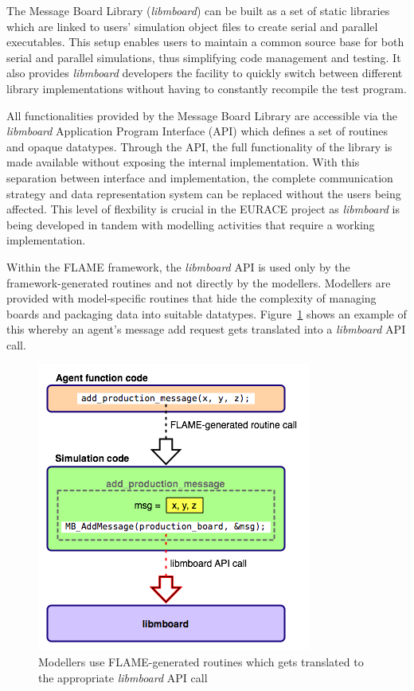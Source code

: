 The Message Board Library (\textit{libmboard}) can be built as a set of static libraries which are linked to users' simulation object files to create serial and parallel executables. This setup enables users to maintain a common source base for both serial and parallel simulations, thus simplifying code management and testing. It also provides \textit{libmboard} developers the facility to quickly switch between different library implementations without having to constantly recompile the test program.

All functionalities provided by the Message Board Library are accessible via the \textit{libmboard} Application Program Interface (API) which defines a set of routines and opaque datatypes. Through the API, the full functionality of the library is made available without exposing the internal implementation. With this separation between interface and implementation, the complete communication strategy and data representation system can be replaced without the users being affected. This level of flexbility is crucial in the EURACE project as \textit{libmboard} is being developed in tandem with modelling activities that require a working implementation.

Within the FLAME framework, the \textit{libmboard} API is used only by the framework-generated routines and not directly by the modellers. Modellers are provided with model-specific routines that hide the complexity of managing boards and packaging data into suitable datatypes. Figure~\ref{fig:mb_api_flame} shows an example of this whereby an agent's message add request gets translated into a \textit{libmboard} API call.

\begin{figure}[h]
 \centering
  \includegraphics[scale=0.60]{mboard_codetranslate.png}
 \caption{Modellers use FLAME-generated routines which gets translated to the appropriate \textit{libmboard} API call}
 \label{fig:mb_api_flame}
\end{figure}


